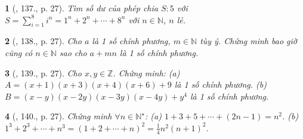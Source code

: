 \documentclass{article}
\newtheorem{baitoan}{}
\begin{document}
\begin{baitoan}[\cite{Tuyen_Toan_8}, 137., p. 27]
	Tìm số dư của phép chia $S:5$ với $S = \sum_{i=1}^8 i^n = 1^n + 2^n + \cdots + 8^n$ với $n\in\mathbb{N}$, $n$ lẻ.
\end{baitoan}

\begin{baitoan}[\cite{Tuyen_Toan_8}, 138., p. 27]
	Cho $a$ là 1 số chính phương, $m\in\mathbb{N}$ tùy ý. Chứng minh bao giờ cũng có $n\in\mathbb{N}$ sao cho $a + mn$ là 1 số chính phương.
\end{baitoan}

\begin{baitoan}[\cite{Tuyen_Toan_8}, 139., p. 27]
	Cho $x,y\in\mathbb{Z}$. Chứng minh: (a) $A = (x + 1)(x + 3)(x + 4)(x + 6) + 9$ là 1 số chính phương. (b) $B = (x - y)(x - 2y)(x - 3y)(x - 4y) + y^4$ là 1 số chính phương.
\end{baitoan}

\begin{baitoan}[\cite{Tuyen_Toan_8}, 140., p. 27]
	Chứng minh $\forall n\in\mathbb{N}^\star$: (a) $1 + 3 + 5 + \cdots + (2n - 1) = n^2$. (b) $1^3 + 2^3 + \cdots + n^3 = (1 + 2 + \cdots + n)^2 = \frac{1}{4}n^2(n + 1)^2$.
\end{baitoan}


\printbibliography[heading=bibintoc]
	
\end{document}
